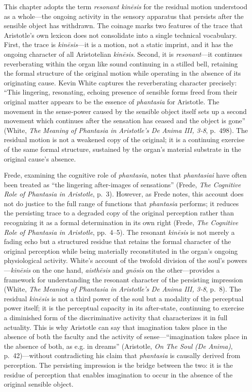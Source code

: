 \documentclass[12pt]{article}
\begin{document}
This chapter adopts the term \textit{resonant kinēsis} for the residual motion understood as a whole---the ongoing activity in the sensory apparatus that persists after the sensible object has withdrawn. The coinage marks two features of the trace that Aristotle's own lexicon does not consolidate into a single technical vocabulary. First, the trace is \textit{kinēsis}---it is a motion, not a static imprint, and it has the ongoing character of all Aristotelian \textit{kinēsis}. Second, it is \textit{resonant}---it continues reverberating within the organ like sound continuing in a stilled bell, retaining the formal structure of the original motion while operating in the absence of its originating cause. Kevin White captures the reverberating character precisely: ``This lingering, resonating, echoing presence of sensible forms freed from their original matter appears to be the essence of \textit{phantasia} for Aristotle. The movement in the sense-power caused by the sensible object itself sets up a second movement which continues after the sensation has ceased and the object is gone'' (White, \textit{The Meaning of Phantasia in Aristotle's De Anima III, 3-8}, p.~498). The residual motion is not a weakened copy of the original; it is a continuing exercise of the same formal structure, sustained by the organ's material substrate in the original cause's absence.

Frede, examining the cognitive role of \textit{phantasia}, notes that \textit{phantasiai} have often been treated as ``the lingering after-images of sensations'' (Frede, \textit{The Cognitive Role of Phantasia in Aristotle}, p.~3). However, as Frede notes, this account does not do justice to the full range of functions that \textit{phantasia} performs; it reduces the persisting trace to a degraded copy of the original perception rather than recognizing it as a formal determination in its own right (Frede, \textit{The Cognitive Role of Phantasia in Aristotle}, pp.~4--5). The resonant \textit{kinēsis} is not merely a fading echo but a structured residue that retains the formal character of the original perception while being materially reconstituted in the organ's ongoing physiological activity. White's account of the twofold division of the soul's powers---\textit{kinēsis} on the one hand, \textit{aisthēsis} and \textit{gnōsis} on the other---provides a framework for understanding the resonant character of the persisting impression (White, \textit{The Meaning of Phantasia in Aristotle's De Anima III, 3-8}, p.~8). The residual \textit{kinēsis} is not a third power of the soul but a modality of the perceptual power itself; it is the perceptual capacity in its after-state, continuing to exercise a diminished form of the discriminative activity that characterizes it in full actuality. This is why Aristotle can say that imagination takes place in the absence of both the faculty and the activity of sense---``imagination takes place in the absence of both, as e.g. in dreams'' (Aristotle, \textit{On The Soul (De Anima)}, p.~42)---without contradicting his claim that \textit{phantasia} is causally derived from perception. The persisting impression is the bridge between the two: it is the residue of perception that enables imagination to occur in the absence of the original sensible object.
\end{document}
